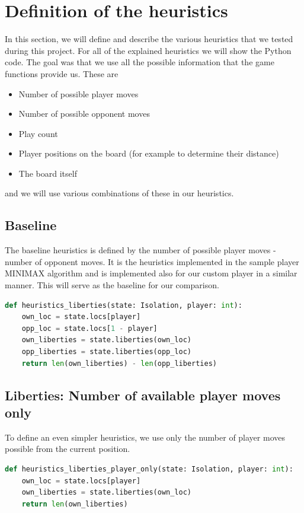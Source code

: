 \documentclass[aps,prd,notitlepage,floatfix,superscriptaddress,groupedaddress,nofootinbib]{revtex4-1}
\begin{document}
\section{Definition of the heuristics}

In this section, we will define and describe the various heuristics that we tested during this project. For all of the explained heuristics we will show the Python code. The goal was that we use all the possible information that the game functions provide us. These are
\begin{itemize}
    \item Number of possible player moves
    \item Number of possible opponent moves
    \item Play count
    \item Player positions on the board (for example to determine their distance)
    \item The board itself
\end{itemize}
and we will use various combinations of these in our heuristics.

\subsection{Baseline}
The baseline heuristics is defined by the number of possible player moves - number of opponent moves. It is the heuristics implemented in the sample player MINIMAX algorithm and is implemented also for our custom player in a similar manner. This will serve as the baseline for our comparison.

\begin{lstlisting}[language=python]
def heuristics_liberties(state: Isolation, player: int):
    own_loc = state.locs[player]
    opp_loc = state.locs[1 - player]
    own_liberties = state.liberties(own_loc)
    opp_liberties = state.liberties(opp_loc)
    return len(own_liberties) - len(opp_liberties)
\end{lstlisting}

\subsection*{Liberties: Number of available player moves only}
To define an even simpler heuristics, we use only the number of player moves possible from the current position.

\begin{lstlisting}[language=python]
def heuristics_liberties_player_only(state: Isolation, player: int):
    own_loc = state.locs[player]
    own_liberties = state.liberties(own_loc)
    return len(own_liberties)
\end{lstlisting}
\end{document}
